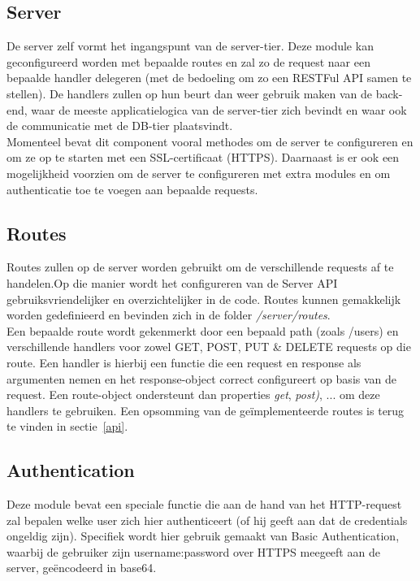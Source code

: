 \documentclass{article}
\begin{document}
\subsection{Server}

De server zelf vormt het ingangspunt van de server-tier. Deze module kan geconfigureerd worden met bepaalde routes en zal zo de request naar een bepaalde handler delegeren (met de bedoeling om zo een RESTFul API samen te stellen). De handlers zullen op hun beurt dan weer gebruik maken van de back-end, waar de meeste applicatielogica van de server-tier zich bevindt en waar ook de communicatie met de DB-tier plaatsvindt.  \\

Momenteel bevat dit component vooral methodes om de server te configureren en om ze op te starten met een SSL-certificaat (HTTPS). Daarnaast is er ook een mogelijkheid voorzien om de server te configureren met extra modules en om authenticatie toe te voegen aan bepaalde requests.

\subsection{Routes}

Routes zullen op de server worden gebruikt om de verschillende requests af te handelen.Op die manier wordt het configureren van de Server API gebruiksvriendelijker en overzichtelijker in de code. Routes kunnen gemakkelijk worden gedefinieerd en bevinden zich in de folder \textit{/server/routes}.\\

Een bepaalde route wordt gekenmerkt door een bepaald path (zoals /users) en verschillende handlers voor zowel GET, POST, PUT \& DELETE requests op die route. Een handler is hierbij een functie die een request en response als argumenten nemen en het response-object correct configureert op basis van de request. Een route-object ondersteunt dan properties \textit{get}, \textit{post)}, ... om deze handlers te gebruiken. Een opsomming van de ge\"implementeerde routes is terug te vinden in sectie~\ref{api}.

\subsection{Authentication}

Deze module bevat een speciale functie die aan de hand van het HTTP-request zal bepalen welke user zich hier authenticeert (of hij geeft aan dat de credentials ongeldig zijn). Specifiek wordt hier gebruik gemaakt van Basic Authentication, waarbij de gebruiker zijn username:password over HTTPS meegeeft aan de server, ge\"encodeerd in base64.\\
\end{document}
